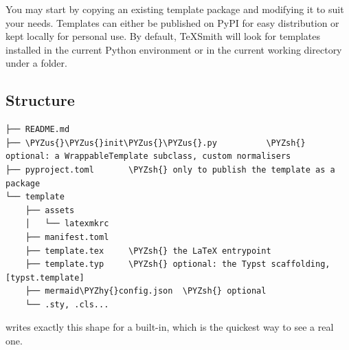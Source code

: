 \documentclass[a4paper,twoside]{article}
\begin{document}
You may start by copying an existing template package and modifying it to suit
your needs. Templates can either be published on PyPI for easy distribution or kept locally for personal use. By default, TeXSmith will look for templates installed in the current Python environment or in the current working directory under a  folder.
\subsection{Structure}
\begin{tscode}[lang=text, stretch=0.5, engine=pygments]
\begin{Verbatim}[commandchars=\\\{\},breaklines, breakanywhere, commandchars=\\\{\}]
├── README.md
├── \PYZus{}\PYZus{}init\PYZus{}\PYZus{}.py          \PYZsh{} optional: a WrappableTemplate subclass, custom normalisers
├── pyproject.toml       \PYZsh{} only to publish the template as a package
└── template
    ├── assets
    │   └── latexmkrc
    ├── manifest.toml
    ├── template.tex     \PYZsh{} the LaTeX entrypoint
    ├── template.typ     \PYZsh{} optional: the Typst scaffolding, [typst.template]
    ├── mermaid\PYZhy{}config.json  \PYZsh{} optional
    └── .sty, .cls...
\end{Verbatim}
\end{tscode}
 writes exactly this
shape for a built-in, which is the quickest way to see a real one.
\end{document}
